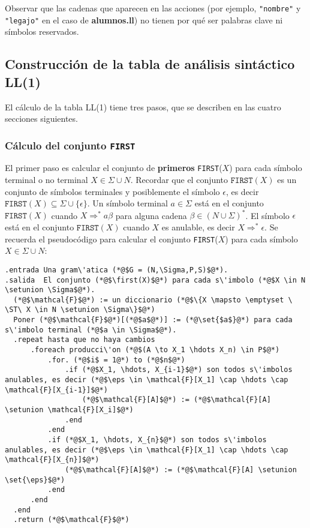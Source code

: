 \documentclass{article}
\newcommand{\first}{\texttt{FIRST}\xspace}
\newcommand{\setunion}{\cup}
\newcommand{\ST}{\mid}
\newcommand{\set}[1]{\{#1\}}
\newcommand{\eps}{\epsilon}
\renewcommand{\emptyset}{\varnothing}
\begin{document}
Observar que las cadenas que aparecen en las acciones (por ejemplo,
\verb|"nombre"| y \verb|"legajo"| en el caso de {\bf alumnos.ll})
no tienen por qu\'e ser palabras clave ni s\'imbolos reservados.

\subsection{Construcci\'on de la tabla de an\'alisis sint\'actico LL(1)}

El c\'alculo de la tabla LL(1) tiene tres pasos, que se describen en
las cuatro secciones siguientes.

\subsubsection{C\'alculo del conjunto \texttt{FIRST}}

El primer paso es calcular el conjunto de {\bf primeros} \texttt{FIRST}($X$) para cada s\'imbolo terminal o no terminal $X \in \Sigma \cup N$.
Recordar que el conjunto $\first(X)$ es un conjunto de s\'imbolos terminales y posiblemente el s\'imbolo $\eps$,
es decir $\first(X) \subseteq \Sigma \cup \set{\eps}$.
Un s\'imbolo terminal $a \in \Sigma$ est\'a en el conjunto $\texttt{FIRST}(X)$
cuando $X \Rightarrow^* a\beta$ para alguna cadena $\beta \in (N \cup \Sigma)^*$.
El s\'imbolo $\eps$ est\'a en el conjunto $\texttt{FIRST}(X)$
cuando $X$ es anulable, es decir $X \Rightarrow^* \eps$.
Se recuerda el pseudoc\'odigo para calcular el conjunto \texttt{FIRST}($X$) para
cada s\'imbolo $X \in \Sigma \cup N$:
\vspace{1cm}
\begin{lstlisting}
.entrada Una gram\'atica (*@$G = (N,\Sigma,P,S)$@*).
.salida  El conjunto (*@$\first(X)$@*) para cada s\'imbolo (*@$X \in N \setunion \Sigma$@*).
  (*@$\mathcal{F}$@*) := un diccionario (*@$\{X \mapsto \emptyset \ \ST\ X \in N \setunion \Sigma\}$@*)
  Poner (*@$\mathcal{F}$@*)[(*@$a$@*)] := (*@\set{$a$}@*) para cada s\'imbolo terminal (*@$a \in \Sigma$@*).
  .repeat hasta que no haya cambios
      .foreach producci\'on (*@$(A \to X_1 \hdots X_n) \in P$@*)
          .for. (*@$i$ = 1@*) to (*@$n$@*)
              .if (*@$X_1, \hdots, X_{i-1}$@*) son todos s\'imbolos anulables, es decir (*@$\eps \in \mathcal{F}[X_1] \cap \hdots \cap \mathcal{F}[X_{i-1}]$@*)
                  (*@$\mathcal{F}[A]$@*) := (*@$\mathcal{F}[A] \setunion \mathcal{F}[X_i]$@*)
              .end
          .end
          .if (*@$X_1, \hdots, X_{n}$@*) son todos s\'imbolos anulables, es decir (*@$\eps \in \mathcal{F}[X_1] \cap \hdots \cap \mathcal{F}[X_{n}]$@*)
              (*@$\mathcal{F}[A]$@*) := (*@$\mathcal{F}[A] \setunion \set{\eps}$@*)
          .end
      .end
  .end
  .return (*@$\mathcal{F}$@*)
\end{lstlisting}
\end{document}
